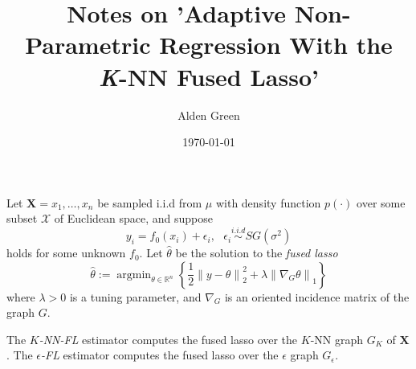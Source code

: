 \documentclass{article}
\newcommand{\Reals}{\mathbb{R}}
\newcommand{\norm}[1]{\left\lVert#1\right\rVert}
\newcommand{\set}[1]{\left\{#1\right\}}
\DeclareMathOperator*{\argmin}{argmin}
\newcommand{\Xbf}{\mathbf{X}}
\newcommand{\Xset}{\mathcal{X}}
\theoremstyle{alden}
\theoremstyle{aldenthm}
\theoremstyle{definition}
\theoremstyle{remark}
\begin{document}
	
\title{Notes on 'Adaptive Non-Parametric Regression With the \emph{K}-NN Fused Lasso'}
\author{Alden Green}
\date{\today}
\maketitle

Let $\Xbf = x_1, \ldots, x_n$ be sampled i.i.d from $\mu$ with density function $p(\cdot)$ over some subset $\Xset$ of Euclidean space, and suppose
\begin{equation*}
y_i = f_0(x_i) + \epsilon_i, ~~~\epsilon_i \overset{i.i.d}{\sim}SG(\sigma^2)
\end{equation*}
holds for some unknown $f_0$. Let $\widehat{\theta}$ be the solution to the \emph{fused lasso}
\begin{equation*}
\widehat{\theta} := \argmin_{\theta \in \Reals^n} \set{\frac{1}{2} \norm{y - \theta}_2^2 + \lambda \norm{\nabla_G \theta}_1} 
\end{equation*}
where $\lambda > 0$ is a tuning parameter, and $\nabla_G$ is an oriented incidence matrix of the graph $G$. 

The \emph{$K$-NN-FL} estimator computes the fused lasso over the $K$-NN graph $G_K$ of $\Xbf$. The \emph{$\epsilon$-FL} estimator computes the fused lasso over the $\epsilon$ graph $G_{\epsilon}$.
\end{document}
